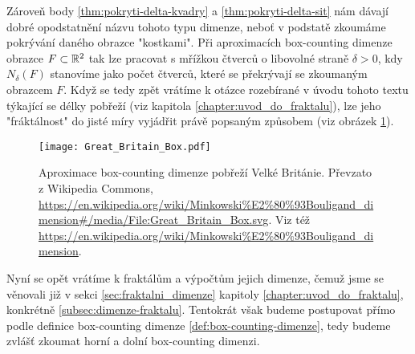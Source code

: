 Zároveň body \ref{thm:pokryti-delta-kvadry} a \ref{thm:pokryti-delta-sit} nám dávají dobré opodstatnění názvu tohoto typu dimenze, neboť v podstatě zkoumáme pokrývání daného obrazce "kostkami". Při aproximacích box-counting dimenze obrazce $F\subset\mathbb{R}^2$ tak lze pracovat s mřížkou čtverců o libovolné straně $\delta>0$, kdy $N_\delta(F)$ stanovíme jako počet čtverců, které se překrývají se zkoumaným obrazcem $F$. Když se tedy zpět vrátíme k otázce rozebírané v úvodu tohoto textu týkající se délky pobřeží (viz kapitola \ref{chapter:uvod_do_fraktalu}), lze jeho "fráktálnost" do jisté míry vyjádřit právě popsaným způsobem (viz obrázek \ref{fig:aproximace-delky-pobrezi-vb}).
\begin{figure}[h]
    \centering
    \texttt{[image: Great\_Britain\_Box.pdf]}
    \caption{Aproximace box-counting dimenze pobřeží Velké Británie. Převzato z Wikipedia Commons, \url{https://en.wikipedia.org/wiki/Minkowski\%E2\%80\%93Bouligand\_dimension\#/media/File:Great\_Britain\_Box.svg}. Viz též \url{https://en.wikipedia.org/wiki/Minkowski\%E2\%80\%93Bouligand\_dimension}.}
    \label{fig:aproximace-delky-pobrezi-vb}
\end{figure}
Nyní se opět vrátíme k fraktálům a výpočtům jejich dimenze, čemuž jsme se věnovali již v sekci \ref{sec:fraktalni_dimenze} kapitoly \ref{chapter:uvod_do_fraktalu}, konkrétně \ref{subsec:dimenze-fraktalu}. Tentokrát však budeme postupovat přímo podle definice box-counting dimenze \ref{def:box-counting-dimenze}, tedy budeme zvlášť zkoumat horní a dolní box-counting dimenzi.
